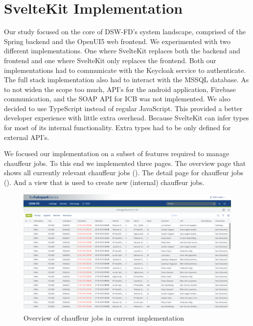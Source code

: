 \section{SvelteKit Implementation}


Our study focused on the core of DSW-FD's system landscape, comprised of the Spring backend and the OpenUI5 web frontend. We experimented with two different implementations. One where SvelteKit replaces both the backend and frontend and one where SvelteKit only replaces the frontend. Both our implementations had to communicate with the Keycloak service to authenticate. The full stack implementation also had to interact with the MSSQL database. As to not widen the scope too much, API's for the android application, Firebase communication, and the SOAP API for ICB was not implemented. We also decided to use TypeScript instead of regular JavaScript. This provided a better developer experience with little extra overhead. Because SvelteKit can infer types for most of its internal functionality. Extra types had to be only defined for external API's.

We focused our implementation on a subset of features required to manage chauffeur jobs. To this end we implemented three pages. The overview page that shows all currently relevant chauffeur jobs (). The detail page for chauffeur jobs (). And a view that is used to create new (internal) chauffeur jobs.

\begin{figure}
    \centering
    \includegraphics[width=\linewidth]{assets/current-auftrag-overview}
    \caption{Overview of chauffeur jobs in current implementation}
    \label{fig:current-overview-auftrag}
\end{figure}

